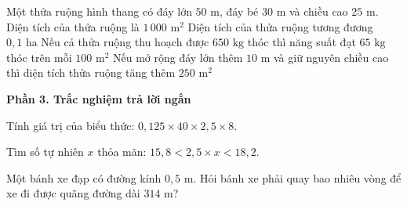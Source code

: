\begin{ex} %
Một thửa ruộng hình thang có đáy lớn $50\text{ m}$, đáy bé $30\text{ m}$ và chiều cao $25\text{ m}$.
\choiceTF
{\True Diện tích của thửa ruộng là $1\,000\text{ m}^2$}
{\True Diện tích của thửa ruộng tương đương $0{,}1\text{ ha}$}
{\True Nếu cả thửa ruộng thu hoạch được $650\text{ kg}$ thóc thì năng suất đạt $65\text{ kg}$ thóc trên mỗi $100\text{ m}^2$}
{Nếu mở rộng đáy lớn thêm $10\text{ m}$ và giữ nguyên chiều cao thì diện tích thửa ruộng tăng thêm $250\text{ m}^2$}
\end{ex}

\textbf{Phần 3. Trắc nghiệm trả lời ngắn}

\begin{ex} %
Tính giá trị của biểu thức: $0{,}125 \times 40 \times 2{,}5 \times 8$.
\end{ex}

\begin{ex} %
Tìm số tự nhiên $x$ thỏa mãn: $15{,}8 < 2{,}5 \times x < 18{,}2$.
\end{ex}

\begin{ex} %
Một bánh xe đạp có đường kính $0{,}5\text{ m}$. Hỏi bánh xe phải quay bao nhiêu vòng để xe đi được quãng đường dài $314\text{ m}$?
\end{ex}

